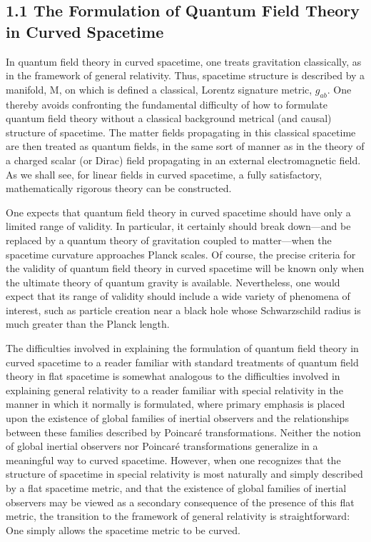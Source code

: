 \documentclass[11pt,a4paper]{article}
\begin{document}
\subsection*{1.1 The Formulation of Quantum Field Theory in Curved Spacetime}\hypertarget{sec:1.1}{}

In quantum field theory in curved spacetime, one treats gravitation classically, as in the framework of general relativity. Thus, spacetime structure is described by a manifold, M, on which is defined a classical, Lorentz signature metric, \(g_{ab}\). One thereby avoids confronting the fundamental difficulty of how to formulate quantum field theory without a classical background metrical (and causal) structure of spacetime. The matter fields propagating in this classical spacetime are then treated as quantum fields, in the same sort of manner as in the theory of a charged scalar (or Dirac) field propagating in an external electromagnetic field. As we shall see, for linear fields in curved spacetime, a fully satisfactory, mathematically rigorous theory can be constructed.

One expects that quantum field theory in curved spacetime should have only a limited range of validity. In particular, it certainly should break down---and be replaced by a quantum theory of gravitation coupled to matter---when the spacetime curvature approaches Planck scales. Of course, the precise criteria for the validity of quantum field theory in curved spacetime will be known only when the ultimate theory of quantum gravity is available. Nevertheless, one would expect that its range of validity should include\hypertarget{source-15}{} a wide variety of phenomena of interest, such as particle creation near a black hole whose Schwarzschild radius is much greater than the Planck length.

The difficulties involved in explaining the formulation of quantum field theory in curved spacetime to a reader familiar with standard treatments of quantum field theory in flat spacetime is somewhat analogous to the difficulties involved in explaining general relativity to a reader familiar with special relativity in the manner in which it normally is formulated, where primary emphasis is placed upon the existence of global families of inertial observers and the relationships between these families described by Poincaré transformations. Neither the notion of global inertial observers nor Poincaré transformations generalize in a meaningful way to curved spacetime. However, when one recognizes that the structure of spacetime in special relativity is most naturally and simply described by a flat spacetime metric, and that the existence of global families of inertial observers may be viewed as a secondary consequence of the presence of this flat metric, the transition to the framework of general relativity is straightforward: One simply allows the spacetime metric to be curved.
\end{document}
